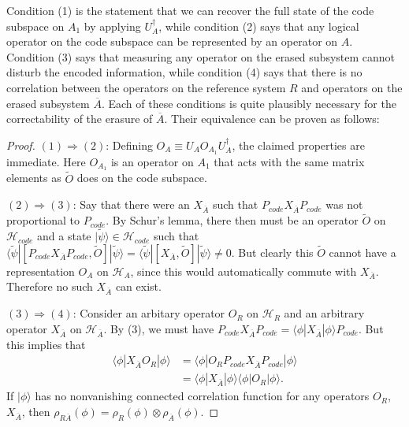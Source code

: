 \documentclass[12pt]{article}
\newcommand{\lan}{\langle}
\newcommand{\ran}{\rangle}
\newcommand{\wt}{\widetilde}
\newcommand{\HA}{\mathcal{H}_A}
\newcommand{\HAb}{\mathcal{H}_{\ol{A}}}
\newcommand{\Ab}{\ol{A}}
\newcommand{\Hc}{\mathcal{H}_{code}}
\newcommand{\ol}{\overline}
\newcommand{\Pc}{P_{code}}
\begin{document}
Condition (1) is the statement that we can recover the full state of the code subspace on $A_1$ by applying $U_{A}^\dagger$, while condition (2) says that any logical operator on the code subspace can be represented by an operator on $A$.  Condition (3) says that measuring any operator on the erased subsystem cannot disturb the encoded information, while condition (4) says that there is no correlation between the operators on the reference system $R$ and operators on the erased subsystem $\ol{A}$.  Each of these conditions is quite plausibly necessary for the correctability of the erasure of $\Ab$.  Their equivalence can be proven as follows:
\begin{proof}

$(1)\Rightarrow (2)$: Defining $O_A\equiv U_A O_{A_1} U_A^\dagger$, the claimed properties are immediate.  Here $O_{A_1}$ is an operator on $A_1$ that acts with the same matrix elements as $\wt{O}$ does on the code subspace.


$(2)\Rightarrow(3)$:  Say that there were an $X_{\Ab}$ such that $P_{code}X_{\Ab}P_{code}$ was not proportional to $P_{code}$.  By Schur's lemma, there then must be an operator $\wt{O}$ on $\Hc$ and a state $|\wt{\psi}\ran\in \Hc$ such that $\lan\wt{\psi}|[P_{code}X_{\Ab}P_{code},\wt{O}]|\wt{\psi}\ran=\lan\wt{\psi}|[X_{\Ab},\wt{O}]|\wt{\psi}\ran\neq 0$.  But clearly this $\wt{O}$ cannot have a representation $O_A$ on $\HA$, since this would automatically commute with $X_{\Ab}$.  Therefore no such $X_{\Ab}$ can exist.  

$(3)\Rightarrow(4)$: Consider an arbitary operator $O_R$ on $\mathcal{H}_R$ and an arbitrary operator $X_{\Ab}$ on $\HAb$.  By (3), we must have $\Pc X_{\Ab} \Pc=\lan\phi|X_{\Ab}|\phi\ran \Pc$.  But this implies that
\begin{align}\nonumber
\lan\phi|X_{\Ab}O_R|\phi\ran&=\lan\phi|O_R \Pc X_{\Ab}\Pc |\phi\ran\\
&=\lan\phi|X_{\Ab}|\phi\ran\lan\phi|O_R|\phi\ran.
\end{align}
If $|\phi\ran$ has no nonvanishing connected correlation function for any operators $O_R$, $X_{\Ab}$, then $\rho_{R\Ab}(\phi)=\rho_{R}(\phi)\otimes \rho_{\Ab}(\phi)$. 


\end{proof}
\end{document}
